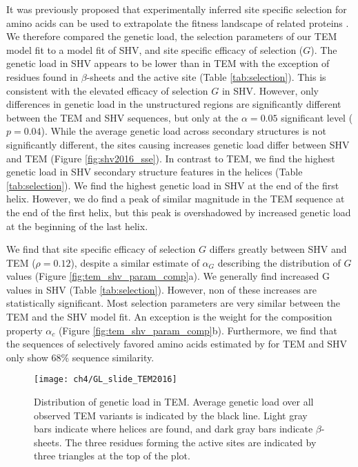 It was previously proposed that experimentally inferred site specific selection for amino acids can be used to extrapolate the fitness landscape of related proteins \citep{bloom2014, bloom2017}.
We therefore compared the genetic load, the \selac selection parameters of our \selac TEM model fit to a \selac model fit of SHV, and site specific efficacy of selection ($G$).
The genetic load in SHV appears to be lower than in TEM with the exception of residues found in $\beta$-sheets and the active site (Table \ref{tab:selection}).
This is consistent with the elevated efficacy of selection $G$ in SHV.
However, only differences in genetic load in the unstructured regions are significantly different between the TEM and SHV sequences, but only at the $\alpha = 0.05$ significant level ($p = 0.04$).
While the average genetic load across secondary structures is not significantly different, the sites causing increases genetic load differ between SHV and TEM (Figure \ref{fig:shv2016_sse}).
In contrast to TEM, we find the highest genetic load in SHV secondary structure features in the helices (Table \ref{tab:selection}).
We find the highest genetic load in SHV at the end of the first helix.
However, we do find a peak of similar magnitude in the TEM sequence at the end of the first helix, but this peak is overshadowed by increased genetic load at the beginning of the last helix.

We find that site specific efficacy of selection $G$ differs greatly between SHV and TEM ($\rho = 0.12$), despite a similar estimate of $\alpha_G$ describing the distribution of $G$ values (Figure \ref{fig:tem_shv_param_comp}a).
We generally find increased G values in SHV (Table \ref{tab:selection}).
However, non of these increases are statistically significant.
Most \selac selection parameters are very similar between the TEM and the SHV model fit. 
An exception is the weight for the \PC composition property $\alpha_c$ (Figure \ref{fig:tem_shv_param_comp}b).
Furthermore, we find that the sequences of selectively favored amino acids estimated by \selac for TEM and SHV only show $68 \%$ sequence similarity.


\singlespacing
\begin{figure}[H]
     \centering
	\texttt{[image: ch4/GL\_slide\_TEM2016]}
	\caption{Distribution of genetic load in TEM. 
	Average genetic load over all observed TEM variants is indicated by the black line. 
	Light gray bars indicate where helices are found, and dark gray bars indicate $\beta$-sheets.
	The three residues forming the active sites are indicated by three triangles at the top of the plot.}
	\label{fig:tem2016_sse}
\end{figure}
\doublespacing

